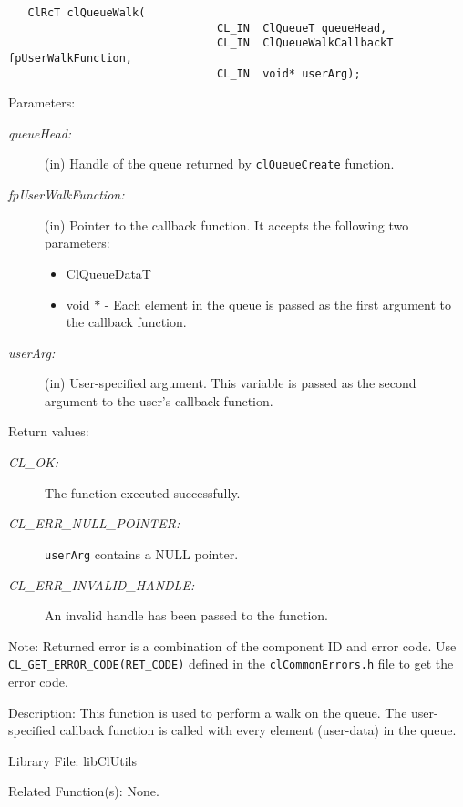 \begin{flushleft}
\begin{Desc}
\footnotesize\begin{verbatim}   ClRcT clQueueWalk(
                       			CL_IN  ClQueueT queueHead,
                       			CL_IN  ClQueueWalkCallbackT fpUserWalkFunction,
                       			CL_IN  void* userArg);
\end{verbatim}
\normalsize
\end{Desc}
\begin{Desc}
\item[Parameters:]
\begin{description}
\item[{\em queue\-Head:}](in) Handle of the queue returned by {\tt{cl\-Queue\-Create}} function.
\item[{\em fp\-User\-Walk\-Function:}](in) Pointer to the callback function. It accepts the following two parameters: \begin{itemize}
\item Cl\-Queue\-Data\-T \item void $\ast$ - Each element in the queue is passed as the first argument to the callback function.\end{itemize}
\item[{\em user\-Arg:}](in) User-specified argument. This variable is passed as the second argument to the user's callback function.\end{description}
\end{Desc}
\begin{Desc}
\item[Return values:]
\begin{description}
\item[{\em CL\_\-OK:}]The function executed successfully. 
\item[{\em CL\_\-ERR\_\-NULL\_\-POINTER:}]{\tt{userArg}} contains a NULL pointer. 
\item[{\em CL\_\-ERR\_\-INVALID\_\-HANDLE:}]An invalid handle has been passed to the function.\end{description}
\end{Desc}
\begin{Desc}
\item[Note:]Returned error is a combination of the component ID and error code. Use 
{\tt {CL\_\-GET\_\-ERROR\_\-CODE(RET\_\-CODE)}} defined in the {\tt{clCommonErrors.h}} file to get the error code.\end{Desc}
\begin{Desc}
\item[Description:]This function is used to perform a walk on the queue. The user-specified callback function is called with every element (user-data) in the 
queue.\end{Desc}
\begin{Desc}
\item[Library File:]lib\-Cl\-Utils\end{Desc}
\begin{Desc}
\item[Related Function(s):]None. \end{Desc}
\newpage



\end{flushleft}
